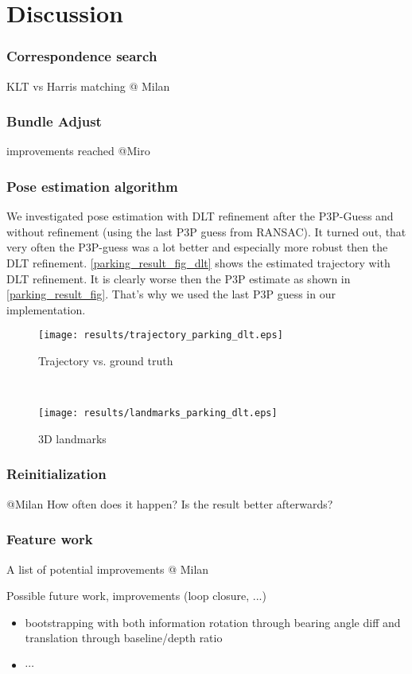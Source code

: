 \section{Discussion}

\subsubsection{Correspondence search}
KLT vs Harris matching
@ Milan

\subsubsection{Bundle Adjust}
improvements reached
@Miro

\subsubsection{Pose estimation algorithm}
We investigated pose estimation with DLT refinement after the P3P-Guess and without refinement (using the last P3P guess from RANSAC). It turned out, that very often the P3P-guess was a lot better and especially more robust then the DLT refinement. \cref{parking_result_fig_dlt} shows the estimated trajectory with DLT refinement. It is clearly worse then the P3P estimate as shown in \cref{parking_result_fig}. That's why we used the last P3P guess in our implementation.
\begin{figure*}[ht!]
    \centering
    \begin{subfigure}[t]{0.5\textwidth}
        \centering
        \texttt{[image: results/trajectory\_parking\_dlt.eps]}
        \caption{Trajectory vs. ground truth}
    \end{subfigure}%
    ~ 
    \begin{subfigure}[t]{0.5\textwidth}
        \centering
        \texttt{[image: results/landmarks\_parking\_dlt.eps]}
        \caption{3D landmarks}
    \end{subfigure}
    \caption{Parking Dataset Results with DLT refinement}
		\label{parking_result_fig_dlt}
\end{figure*}

\subsubsection{Reinitialization}
@Milan
How often does it happen? Is the result better afterwards?

\subsubsection{Feature work}
A list of potential improvements
@ Milan

Possible future work, improvements (loop closure, ...)

\begin{itemize}
\item bootstrapping with both information rotation through bearing angle diff and translation through baseline/depth ratio
\item $\cdots$
\end{itemize}
